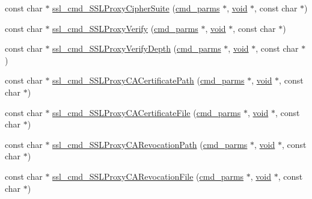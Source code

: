 \begin{DoxyCompactItemize}
\item 
const char $\ast$ \hyperlink{group__MOD__SSL__PRIVATE_ga5752f72e1dc89273eaae902d4b406162}{ssl\+\_\+cmd\+\_\+\+S\+S\+L\+Proxy\+Cipher\+Suite} (\hyperlink{group__APACHE__CORE__CONFIG_ga1791fbd28d06a9847bad001541c5241e}{cmd\+\_\+parms} $\ast$, \hyperlink{group__MOD__ISAPI_gacd6cdbf73df3d9eed42fa493d9b621a6}{void} $\ast$, const char $\ast$)
\item 
const char $\ast$ \hyperlink{group__MOD__SSL__PRIVATE_ga0165ffaf9608ae191863509ec411b965}{ssl\+\_\+cmd\+\_\+\+S\+S\+L\+Proxy\+Verify} (\hyperlink{group__APACHE__CORE__CONFIG_ga1791fbd28d06a9847bad001541c5241e}{cmd\+\_\+parms} $\ast$, \hyperlink{group__MOD__ISAPI_gacd6cdbf73df3d9eed42fa493d9b621a6}{void} $\ast$, const char $\ast$)
\item 
const char $\ast$ \hyperlink{group__MOD__SSL__PRIVATE_gaf1cf7532d8ad67b6d83ce29b6a46df96}{ssl\+\_\+cmd\+\_\+\+S\+S\+L\+Proxy\+Verify\+Depth} (\hyperlink{group__APACHE__CORE__CONFIG_ga1791fbd28d06a9847bad001541c5241e}{cmd\+\_\+parms} $\ast$, \hyperlink{group__MOD__ISAPI_gacd6cdbf73df3d9eed42fa493d9b621a6}{void} $\ast$, const char $\ast$)
\item 
const char $\ast$ \hyperlink{group__MOD__SSL__PRIVATE_ga485e02d2a4c99e5e5c436dbbced9059e}{ssl\+\_\+cmd\+\_\+\+S\+S\+L\+Proxy\+C\+A\+Certificate\+Path} (\hyperlink{group__APACHE__CORE__CONFIG_ga1791fbd28d06a9847bad001541c5241e}{cmd\+\_\+parms} $\ast$, \hyperlink{group__MOD__ISAPI_gacd6cdbf73df3d9eed42fa493d9b621a6}{void} $\ast$, const char $\ast$)
\item 
const char $\ast$ \hyperlink{group__MOD__SSL__PRIVATE_ga35f4c9d6581ae25ace4fcb505c03edc9}{ssl\+\_\+cmd\+\_\+\+S\+S\+L\+Proxy\+C\+A\+Certificate\+File} (\hyperlink{group__APACHE__CORE__CONFIG_ga1791fbd28d06a9847bad001541c5241e}{cmd\+\_\+parms} $\ast$, \hyperlink{group__MOD__ISAPI_gacd6cdbf73df3d9eed42fa493d9b621a6}{void} $\ast$, const char $\ast$)
\item 
const char $\ast$ \hyperlink{group__MOD__SSL__PRIVATE_ga58b498de6b57f94e4195a09fc44a9f58}{ssl\+\_\+cmd\+\_\+\+S\+S\+L\+Proxy\+C\+A\+Revocation\+Path} (\hyperlink{group__APACHE__CORE__CONFIG_ga1791fbd28d06a9847bad001541c5241e}{cmd\+\_\+parms} $\ast$, \hyperlink{group__MOD__ISAPI_gacd6cdbf73df3d9eed42fa493d9b621a6}{void} $\ast$, const char $\ast$)
\item 
const char $\ast$ \hyperlink{group__MOD__SSL__PRIVATE_ga061cdab13b9eecb645a2b332cc16de64}{ssl\+\_\+cmd\+\_\+\+S\+S\+L\+Proxy\+C\+A\+Revocation\+File} (\hyperlink{group__APACHE__CORE__CONFIG_ga1791fbd28d06a9847bad001541c5241e}{cmd\+\_\+parms} $\ast$, \hyperlink{group__MOD__ISAPI_gacd6cdbf73df3d9eed42fa493d9b621a6}{void} $\ast$, const char $\ast$)

\end{DoxyCompactItemize}
